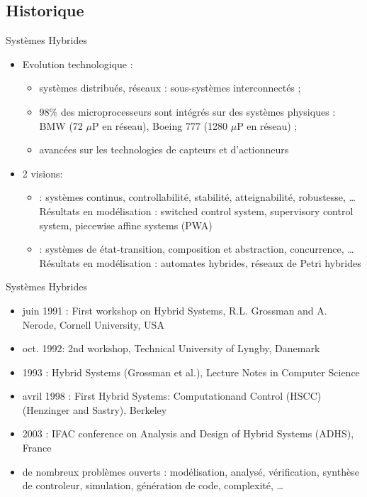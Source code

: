\documentclass[compress]{beamer}
\begin{document}
\subsection{Historique}
\begin{frame}{Systèmes Hybrides}
\begin{itemize}
\item Evolution technologique :
	\begin{itemize}
	\item systèmes distribués, réseaux : sous-systèmes interconnectés ;
	\item 98\% des microprocesseurs sont intégrés sur des systèmes physiques : BMW (72 $\mu$P en réseau), Boeing 777 (1280 $\mu$P en réseau) ;
	\item avancées sur les technologies de capteurs et d'actionneurs
	 \end{itemize}
\item 2 visions:
	\begin{itemize}
	\item {}: systèmes continus, controllabilité, stabilité, atteignabilité, robustesse, \dots Résultats en modélisation : switched control system, supervisory control system, piecewise affine systems (PWA)
	\item {} : systèmes de état-transition, composition et abstraction, concurrence, \dots Résultats en modélisation : automates hybrides, réseaux de Petri hybrides
	\end{itemize}
\end{itemize}
\end{frame}

\begin{frame}{Systèmes Hybrides}
\begin{itemize}
\item juin 1991 : First workshop on Hybrid Systems, R.L. Grossman and A. Nerode, Cornell University, USA
\item oct. 1992: 2nd workshop, Technical University of Lyngby, Danemark
\item 1993 : Hybrid Systems (Grossman et al.), Lecture Notes in Computer Science
\item avril 1998 : First Hybrid Systems: Computationand Control (HSCC) (Henzinger and Sastry), Berkeley
\item 2003 : IFAC conference on Analysis and Design of Hybrid Systems (ADHS), France
\item de nombreux problèmes ouverts : modélisation, analysé, vérification, synthèse de controleur, simulation, génération de code, complexité, \dots
\end{itemize}
\end{frame}
\end{document}
